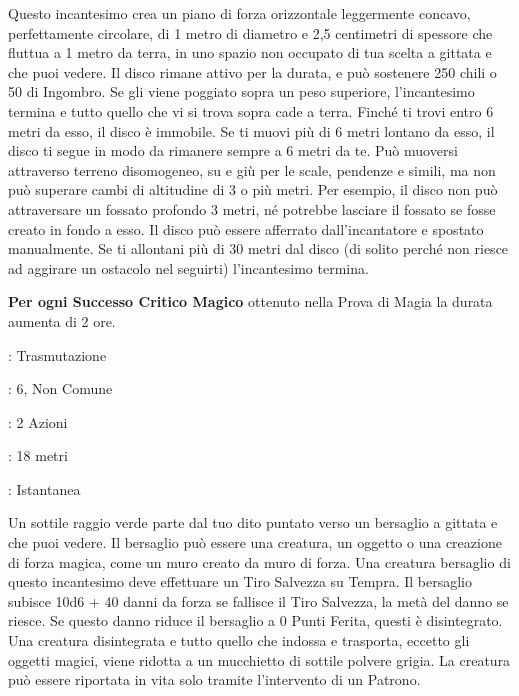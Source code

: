 \begin{multicols}{2}
Questo incantesimo crea un piano di forza orizzontale leggermente concavo, perfettamente circolare, di 1 metro di diametro e 2,5 centimetri di spessore che fluttua a 1 metro da terra, in uno spazio non occupato di tua scelta a gittata e che puoi vedere. Il disco rimane attivo per la durata, e può sostenere 250 chili o 50 di Ingombro. Se gli viene poggiato sopra un peso superiore, l'incantesimo termina e tutto quello che vi si trova sopra cade a terra. Finché ti trovi entro 6 metri da esso, il disco è immobile. Se ti muovi più di 6 metri lontano da esso, il disco ti segue in modo da rimanere sempre a 6 metri da te. Può muoversi attraverso terreno disomogeneo, su e giù per le scale, pendenze e simili, ma non può superare cambi di altitudine di 3 o più metri. Per esempio, il disco non può attraversare un fossato profondo 3 metri, né potrebbe lasciare il fossato se fosse creato in fondo a esso. Il disco può essere afferrato dall'incantatore e spostato manualmente. Se ti allontani più di 30 metri dal disco (di solito perché non riesce ad aggirare un ostacolo nel seguirti) l'incantesimo termina.

\textbf{Per ogni Successo Critico Magico} ottenuto nella Prova di Magia la durata aumenta di 2 ore.

\noindent\colorbox{OBSSgold!10}{
\begin{minipage}{0.95\linewidth}
\begin{description}[noitemsep, topsep=0pt, parsep=0pt, partopsep=0pt, leftmargin=0cm, labelwidth=1.3cm]
	\item[\textbf{Lista}]: Trasmutazione
	\item[\textbf{Livello}]: 6, Non Comune
	\item[\textbf{Lancio}]: 2 Azioni
	\item[\textbf{Gittata}]: 18 metri
	\item[\textbf{Durata}]: Istantanea
\end{description}
\end{minipage}}\smallskip

Un sottile raggio verde parte dal tuo dito puntato verso un bersaglio a gittata e che puoi vedere. Il bersaglio può essere una creatura, un oggetto o una creazione di forza magica, come un muro creato da muro di forza. Una creatura bersaglio di questo incantesimo deve effettuare un Tiro Salvezza su Tempra. Il bersaglio subisce 10d6 + 40 danni da forza se fallisce il Tiro Salvezza, la metà del danno se riesce. Se questo danno riduce il bersaglio a 0 Punti Ferita, questi è disintegrato. Una creatura disintegrata e tutto quello che indossa e trasporta, eccetto gli oggetti magici, viene ridotta a un mucchietto di sottile polvere grigia. La creatura può essere riportata in vita solo tramite l'intervento di un Patrono.


\end{multicols}
